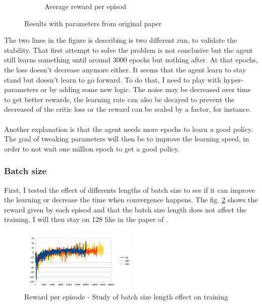 \documentclass{article}
\begin{document}
\begin{figure}[ht]
\begin{subfigure}[b]{.3\textwidth}
    \caption{Average reward per episod}
  \end{subfigure}
  \caption{Results with parameters from original paper}
  \label{fig:baselines}
\end{figure}

The two lines in the figure is describing is two different run, to validate the stability.
That first attempt to solve the problem is not conclusive but the agent still
learns something until around 3000 epochs but nothing after. At that epochs, the
loss doesn't decrease anymore either. It seems that the agent learn to stay
stand but doesn't learn to go forward. To do that, I need to play with
hyper-parameters or by adding some new logic. The noise may be decreased over
time to get better rewards, the learning rate can also be decayed to prevent the
decreased of the critic loss or the reward can be scaled by a factor, for
instance.

\paragraph{}
Another explanation is that the agent needs more epochs to learn a good policy.
The goal of tweaking parameters will then be to improve the learning speed, in
order to not wait one million epoch to get a good policy.

\subsubsection{Batch size}

First, I tested the effect of differents lengths of batch size to see if it can
improve the learning or decrease the time when convergence happens. The fig.
\ref{fig:study_bs} shows the reward given by each episod and that the batch size
length does not affect the training. I will then stay on 128 like in the paper of
\citeauthor{journals/corr/LillicrapHPHETS15}.

\begin{figure}[ht]
  \centering
  \includegraphics[width=0.5\textwidth]{study_batch_size}
  \caption{Reward per episode - Study of batch size length effect on training}
  \label{fig:study_bs}
\end{figure}
\end{document}
